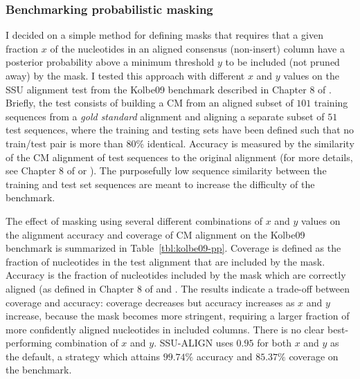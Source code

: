\subsubsection{Benchmarking probabilistic masking}

I decided on a simple method for defining masks that requires that
a given fraction $x$ of the nucleotides in an aligned consensus
(non-insert) column have a posterior probability above a minimum
threshold $y$ to be included (not pruned away) by the mask. I tested
this approach with different $x$ and $y$ values on 
the SSU alignment test from the Kolbe09 benchmark \cite{KolbeEddy09}
described in Chapter 8 of \cite{Nawrocki09b}. Briefly, the test consists of building a CM
from an aligned subset of $101$ training sequences from a \emph{gold
standard}  alignment and aligning a separate subset of $51$ test
sequences, where the training and testing sets have been defined such
that no train/test pair is more than 80\% identical. Accuracy is
measured by the similarity of the CM alignment of test sequences to
the original  alignment (for more details, see Chapter 8 of
\cite{Nawrocki09b} or
\cite{KolbeEddy09}). The purposefully low sequence similarity between
the training and test set sequences are meant to increase the
difficulty of the benchmark. 

The effect of masking using several different combinations of $x$ and
$y$ values on the alignment accuracy and coverage of CM alignment on
the Kolbe09 benchmark is summarized in
Table~\ref{tbl:kolbe09-pp}. Coverage is defined as the fraction of
nucleotides in the test alignment that are included by the mask. Accuracy
is the fraction of nucleotides included by the mask which are correctly
aligned (as defined in Chapter 8 of \cite{Nawrocki09b} and \cite{KolbeEddy09}. 
The results indicate a trade-off between 
coverage and accuracy: coverage decreases but accuracy increases
as $x$ and $y$ increase, because the mask becomes more stringent,
requiring a larger fraction of more confidently aligned nucleotides in
included columns. There is no clear best-performing combination of $x$
and $y$. SSU-ALIGN uses $0.95$ for both $x$ and $y$ as the
default, a strategy which attains $99.74\%$ accuracy and $85.37\%$
coverage on the benchmark. 


